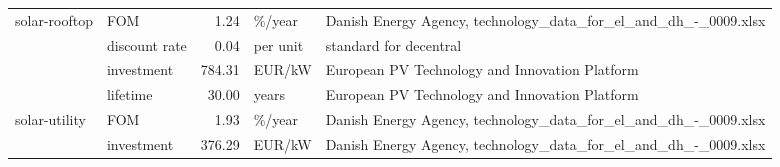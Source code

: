 \begin{longtable}{p{5cm}p{3cm}rp{3cm}p{11cm}}
solar-rooftop & FOM &           1.24 &                            \%/year &                                                                                                                                                                                                                                                                      Danish Energy Agency, technology\_data\_for\_el\_and\_dh\_-\_0009.xlsx \\
                      & discount rate &           0.04 &                          per unit &                                                                                                                                                                                                                                                                                                               standard for decentral \\
                      & investment &         784.31 &                            EUR/kW &                                                                                                                                                                                                                                                                                       European PV Technology and Innovation Platform \\
                      & lifetime &          30.00 &                             years &                                                                                                                                                                                                                                                                                       European PV Technology and Innovation Platform \\
solar-utility & FOM &           1.93 &                            \%/year &                                                                                                                                                                                                                                                                      Danish Energy Agency, technology\_data\_for\_el\_and\_dh\_-\_0009.xlsx \\
                      & investment &         376.29 &                            EUR/kW &                                                                                                                                                                                                                                                                      Danish Energy Agency, technology\_data\_for\_el\_and\_dh\_-\_0009.xlsx \\

\end{longtable}
